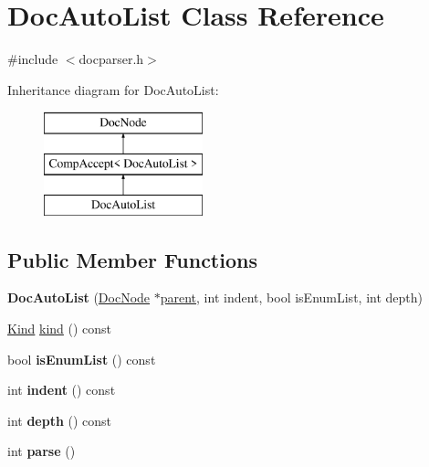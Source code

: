 \hypertarget{class_doc_auto_list}{}\section{Doc\+Auto\+List Class Reference}
\label{class_doc_auto_list}


{\ttfamily \#include $<$docparser.\+h$>$}

Inheritance diagram for Doc\+Auto\+List\+:\begin{figure}[H]
\begin{center}
\leavevmode
\includegraphics[height=3.000000cm]{class_doc_auto_list}
\end{center}
\end{figure}
\subsection*{Public Member Functions}
\begin{DoxyCompactItemize}
\item 
\mbox{\label{class_doc_auto_list_a783a7889add7c4cda00ee00c015dff53}} 
{\bfseries Doc\+Auto\+List} (\mbox{\hyperlink{class_doc_node}{Doc\+Node}} $\ast$\mbox{\hyperlink{class_doc_node_a73e8ad29a91cfceb0968eb00db71a23d}{parent}}, int indent, bool is\+Enum\+List, int depth)
\item 
\mbox{\hyperlink{class_doc_node_aebd16e89ca590d84cbd40543ea5faadb}{Kind}} \mbox{\hyperlink{class_doc_auto_list_af7e24f8b1cfb9b2c6ee150e0d3da70ac}{kind}} () const
\item 
\mbox{\label{class_doc_auto_list_a479dfc09c9f638c9bdead57868c5a3b8}} 
bool {\bfseries is\+Enum\+List} () const
\item 
\mbox{\label{class_doc_auto_list_a972ddd26bd7eb58cbf19c997e5ad9d25}} 
int {\bfseries indent} () const
\item 
\mbox{\label{class_doc_auto_list_a4bb8713cf9dd27a1631e16e3e642a544}} 
int {\bfseries depth} () const
\item 
\mbox{\label{class_doc_auto_list_a8ed0df6d4e379da2f903e00517957e62}} 
int {\bfseries parse} ()
\end{DoxyCompactItemize}
